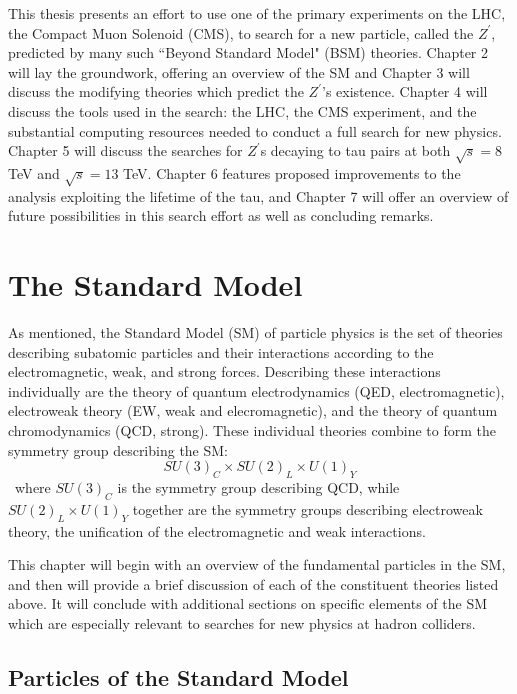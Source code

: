This thesis presents an effort to use one of the primary experiments on the LHC, the Compact Muon Solenoid (CMS), to search for a new particle, called the \emph{$Z^\prime$}, predicted by many such ``Beyond Standard Model" (BSM) theories. Chapter 2 will lay the groundwork, offering an overview of the SM and Chapter 3 will discuss the modifying theories which predict the $Z^\prime$'s existence. Chapter 4 will discuss the tools used in the search: the LHC, the CMS experiment, and the substantial computing resources needed to conduct a full search for new physics. Chapter 5 will discuss the searches for $Z^\prime$s decaying to tau pairs at both $\sqrt{s} = 8$ TeV and $\sqrt{s} = 13$ TeV. Chapter 6 features proposed improvements to the analysis exploiting the lifetime of the tau, and Chapter 7 will offer an overview of future possibilities in this search effort as well as concluding remarks.
\clearpage

\chapter{The Standard Model}


As mentioned, the Standard Model (SM) of particle physics is the set of theories describing subatomic particles and their interactions according to the electromagnetic, weak, and strong forces. Describing these interactions individually are the theory of quantum electrodynamics (QED, electromagnetic), electroweak theory (EW, weak and elecromagnetic), and the theory of quantum chromodynamics (QCD, strong). These individual theories combine to form the symmetry group describing the SM:
\begin{equation}
SU(3)_{C} \times SU(2)_{L} \times U(1)_{Y}
\end{equation}
\noindent\ where $SU(3)_{C}$ is the symmetry group describing QCD, while $SU(2)_{L} \times U(1)_{Y}$ together are the symmetry groups describing electroweak theory, the unification of the electromagnetic and weak interactions.

This chapter will begin with an overview of the fundamental particles in the SM, and then will provide a brief discussion of each of the constituent theories listed above. It will conclude with additional sections on specific elements of the SM which are especially relevant to searches for new physics at hadron colliders.

\section{Particles of the Standard Model}

